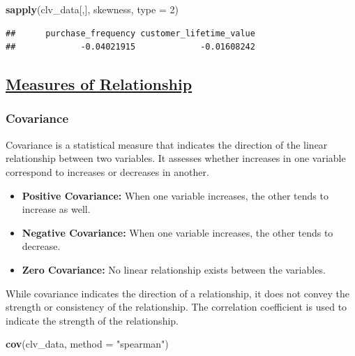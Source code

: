 \documentclass[
]{article}
\newenvironment{Shaded}{\begin{snugshade}}{\end{snugshade}}
\newcommand{\AttributeTok}[1]{\textcolor[rgb]{0.13,0.29,0.53}{#1}}
\newcommand{\DecValTok}[1]{\textcolor[rgb]{0.00,0.00,0.81}{#1}}
\newcommand{\FunctionTok}[1]{\textcolor[rgb]{0.13,0.29,0.53}{\textbf{#1}}}
\newcommand{\NormalTok}[1]{#1}
\newcommand{\StringTok}[1]{\textcolor[rgb]{0.31,0.60,0.02}{#1}}
\begin{document}
\begin{Shaded}
\begin{Highlighting}[]
\FunctionTok{sapply}\NormalTok{(clv\_data[,], skewness, }\AttributeTok{type =} \DecValTok{2}\NormalTok{)}
\end{Highlighting}
\end{Shaded}

\begin{verbatim}
##      purchase_frequency customer_lifetime_value 
##             -0.04021915             -0.01608242
\end{verbatim}

\subsection{\texorpdfstring{\ul{\textbf{Measures of
Relationship}}}{Measures of Relationship}}\label{measures-of-relationship}

\subsubsection{\texorpdfstring{\textbf{Covariance}}{Covariance}}\label{covariance}

Covariance is a statistical measure that indicates the direction of the
linear relationship between two variables. It assesses whether increases
in one variable correspond to increases or decreases in
another.\hspace{0pt}

\begin{itemize}
\item
  \textbf{Positive Covariance:} When one variable increases, the other
  tends to increase as well.
\item
  \textbf{Negative Covariance:} When one variable increases, the other
  tends to decrease.
\item
  \textbf{Zero Covariance:} No linear relationship exists between the
  variables.
\end{itemize}

While covariance indicates the direction of a relationship, it does not
convey the strength or consistency of the relationship. The correlation
coefficient is used to indicate the strength of the relationship.

\begin{Shaded}
\begin{Highlighting}[]
\FunctionTok{cov}\NormalTok{(clv\_data, }\AttributeTok{method =} \StringTok{"spearman"}\NormalTok{)}
\end{Highlighting}
\end{Shaded}
\end{document}
